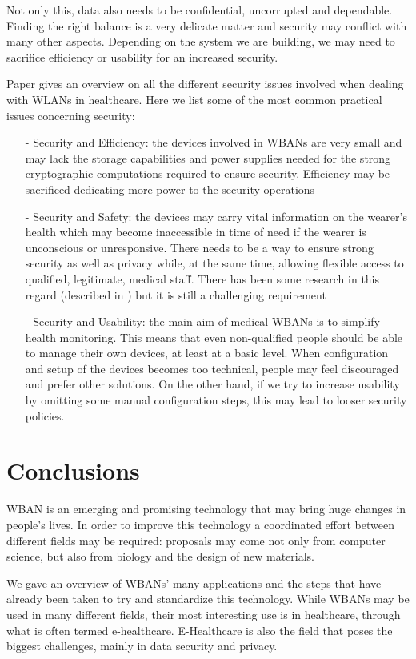 \documentclass[conference]{IEEEtran}
\begin{document}
Not only this, data also needs to be confidential, uncorrupted and dependable. Finding the right balance is a very delicate matter and security may conflict with many other aspects. Depending on the system we are building, we may need to sacrifice efficiency or usability for an increased security. 

Paper \cite{li2010data} gives an overview on all the different security issues involved when dealing with WLANs in healthcare. Here we list some of the most common practical issues concerning security:
	\begin{itemize}
		\item[-] Security and Efficiency: the devices involved in WBANs are very small and may lack the storage capabilities and power supplies needed for the strong cryptographic computations required to ensure security. Efficiency may be sacrificed dedicating more power to the security operations
		\item[-]  Security and Safety: the devices may carry vital information on the wearer's health which may become inaccessible in time of need if the wearer is unconscious or unresponsive. There needs to be a way to ensure strong security as well as privacy while, at the same time, allowing flexible access to qualified, legitimate, medical staff. There has been some research in this regard (described in \cite{li2010data}) but it is still a challenging requirement
		\item[-] Security and Usability: the main aim of medical WBANs is to simplify health monitoring. This means that even non-qualified people should be able to manage their own devices, at least at a basic level. When configuration and setup of the devices becomes too technical, people may feel discouraged and prefer other solutions. On the other hand, if we try to increase usability by omitting some manual configuration steps, this may lead to looser security policies.
	\end{itemize}


\section{Conclusions}
WBAN is an emerging and promising technology that may bring huge changes in people's lives. In order to improve this technology a coordinated effort between different fields may be required: proposals may come not only from computer science, but also from biology and the design of new materials. 

We gave an overview of WBANs' many applications and the steps that have already been taken to try and standardize this technology. While WBANs may be used in many different fields, their most interesting use is in healthcare, through what is often termed e-healthcare. E-Healthcare is also the field that poses the biggest challenges, mainly in data security and privacy.
\end{document}
